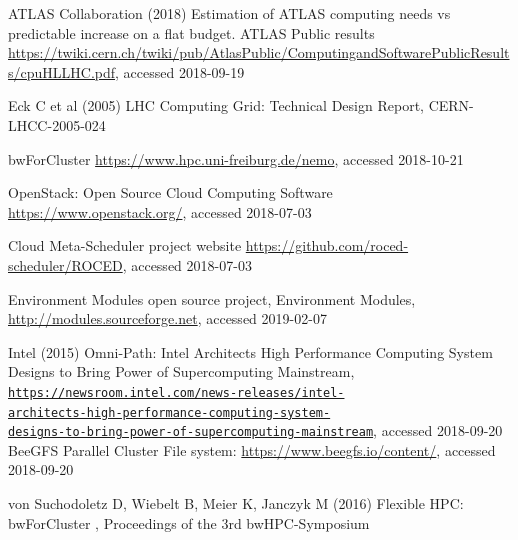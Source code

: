 \begin{thebibliography}{}
%
%
  ATLAS Collaboration (2018) Estimation of ATLAS computing needs vs
  predictable increase on a flat budget. ATLAS Public results
  \url{https://twiki.cern.ch/twiki/pub/AtlasPublic/ComputingandSoftwarePublicResults/cpuHLLHC.pdf},
  accessed 2018-09-19

	Eck C et al
  (2005) LHC Computing Grid: Technical Design Report, 
  CERN-LHCC-2005-024


 bwForCluster \NEMO \url{https://www.hpc.uni-freiburg.de/nemo}, accessed 2018-10-21
  
OpenStack: Open Source Cloud Computing Software
\url{https://www.openstack.org/}, accessed 2018-07-03

\Roced Cloud Meta-Scheduler project website
\url{https://github.com/roced-scheduler/ROCED}, accessed 2018-07-03

Environment Modules open source project,
Environment Modules,
\url{http://modules.sourceforge.net}, accessed 2019-02-07

 Intel (2015) Omni-Path:
Intel Architects High Performance Computing System Designs to Bring
Power of Supercomputing Mainstream,
\texttt{\href{https://newsroom.intel.com/news-releases/intel-architects-high-performance-computing-system-designs-to-bring-power-of-supercomputing-mainstream/}{https://newsroom.intel.com/news-releases/intel-\\architects-high-performance-computing-system-\\designs-to-bring-power-of-supercomputing-mainstream}}, accessed 2018-09-20
BeeGFS Parallel Cluster File system:
\url{https://www.beegfs.io/content/}, accessed 2018-09-20

 von Suchodoletz D,  Wiebelt B,  Meier K,  Janczyk M (2016)
  Flexible HPC: bwForCluster \NEMO,
  Proceedings of the 3rd bwHPC-Symposium %


\end{thebibliography}
